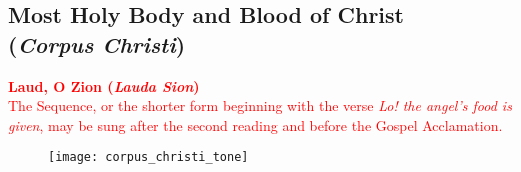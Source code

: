 \documentclass[12pt]{memoir}
\begin{document}
\thispagestyle{empty}

\clearpage

\subsection*{Most Holy Body and Blood of Christ \\ (\textit{Corpus Christi})}
\vspace{1em}

\begin{center}

	\textcolor{red}{\textbf{Laud, O Zion (\textit{Lauda Sion})}} \\
	\textcolor{red}{The Sequence, or the shorter form beginning with the verse \textit{Lo! the angel's food is given}, may be sung after the second reading and before the Gospel Acclamation.} \\[1em]

	\begin{figure}[!h]
		\texttt{[image: corpus\_christi\_tone]}
	\end{figure} 
	
\end{center}
\end{document}
